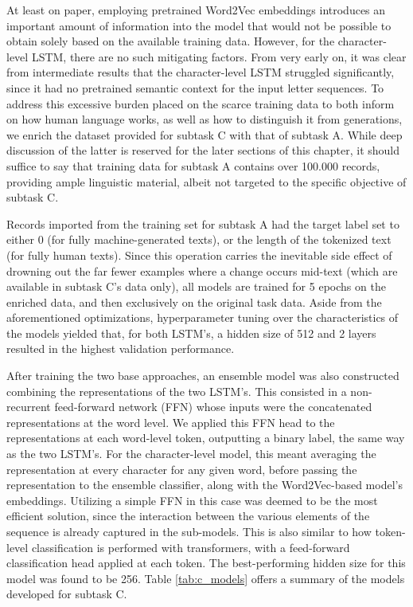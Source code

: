 At least on paper, employing pretrained Word2Vec embeddings introduces an important amount of information into the model that would not be possible to obtain solely based on the available training data.
However, for the character-level LSTM, there are no such mitigating factors.
From very early on, it was clear from intermediate results that the character-level LSTM struggled significantly, since it had no pretrained semantic context for the input letter sequences.
To address this excessive burden placed on the scarce training data to both inform on how human language works, as well as how to distinguish it from generations, we enrich the dataset provided for subtask C with that of subtask A.
While deep discussion of the latter is reserved for the later sections of this chapter, it should suffice to say that training data for subtask A contains over 100.000 records, providing ample linguistic material, albeit not targeted to the specific objective of subtask C.

Records imported from the training set for subtask A had the target label set to either 0 (for fully machine-generated texts), or the length of the tokenized text (for fully human texts).
Since this operation carries the inevitable side effect of drowning out the far fewer examples where a change occurs mid-text (which are available in subtask C's data only), all models are trained for 5 epochs on the enriched data, and then exclusively on the original task data.
Aside from the aforementioned optimizations, hyperparameter tuning over the characteristics of the models yielded that, for both LSTM's, a hidden size of 512 and 2 layers resulted in the highest validation performance.

After training the two base approaches, an ensemble model was also constructed combining the representations of the two LSTM's.
This consisted in a non-recurrent feed-forward network (FFN) whose inputs were the concatenated representations at the word level.
We applied this FFN head to the representations at each word-level token, outputting a binary label, the same way as the two LSTM's.
For the character-level model, this meant averaging the representation at every character for any given word, before passing the representation to the ensemble classifier, along with the Word2Vec-based model's embeddings.
Utilizing a simple FFN in this case was deemed to be the most efficient solution, since the interaction between the various elements of the sequence is already captured in the sub-models.
This is also similar to how token-level classification is performed with transformers, with a feed-forward classification head applied at each token.
The best-performing hidden size for this model was found to be 256.
Table \ref{tab:c_models} offers a summary of the models developed for subtask C.

